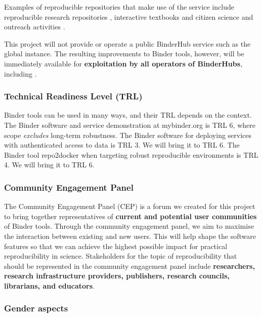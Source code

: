 Examples of reproducible repositories that make use of the \mybinder{} service
include reproducible research repositories
\cite{GitHubRepoExampleAlbert2016,Beg2021}, interactive textbooks
\cite{Fangohr2022,Zeller2022} and citizen science and outreach activities
\cite{ligo-open-science,OSCOVIDA2022}.

This \TheProject{} project will not provide or operate a public BinderHub service such as the global
\mybinder{} instance. The resulting improvements to Binder tools, however, will be
immediately available for \textbf{exploitation by all operators of BinderHubs}, including \mybinder{}.


\subsubsection{Technical Readiness Level (TRL)}

Binder tools can be used in many ways, and their TRL depends on the context.
The Binder software and service demonstration at mybinder.org is TRL 6,
where scope \emph{excludes} long-term robustness.
The Binder software for deploying services with authenticated access to data is TRL 3.
We will bring it to TRL 6.
The Binder tool repo2docker when targeting robust reproducible environments is TRL 4.
We will bring it to TRL 6.


\subsubsection{Community Engagement Panel}\label{sec:community-engagement-panel}
The Community Engagement Panel (CEP) is a forum we created for this project to bring together
representatives of \textbf{current and potential user communities} of Binder tools.
Through the community engagement panel, we aim to maximise the interaction between existing and new users.
This will help shape the software features so that we can
achieve the highest possible impact for practical reproducibility in science.
Stakeholders for the topic of reproducibility that should be represented in the
community engagement panel include \textbf{researchers, research infrastructure
providers, publishers, research councils, librarians, and educators}.



\subsubsection{Gender aspects}\label{sec:gender}

